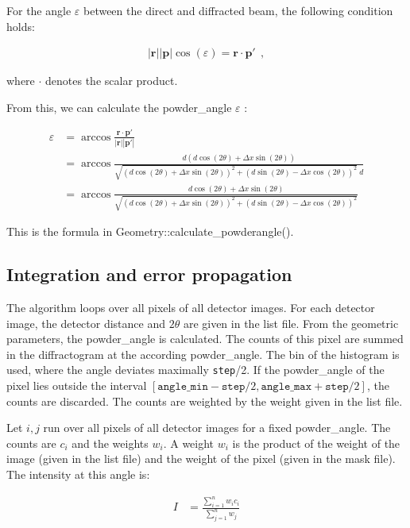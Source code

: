 \documentclass[a4paper, 12pt, twoside]{scrartcl}
\begin{document}
For the angle $ \varepsilon $ between the direct and diffracted beam, the following condition holds:

\begin{align*}
	|\boldsymbol{r}| |\boldsymbol{p}| \cos(\varepsilon) = \boldsymbol{r} \cdot \boldsymbol{p'}~~\mathrm{,}
\end{align*}

where $ \cdot $ denotes the scalar product.

From this, we can calculate the powder\_angle $ \varepsilon $ :

\begin{align*}
	\varepsilon &= \arccos \frac{\boldsymbol{r} \cdot \boldsymbol{p'}}{|\boldsymbol{r}||\boldsymbol{p'}|} \\
	&= \arccos \frac{d ( d\cos(2\theta) + \Delta x \sin(2\theta))}{\sqrt{(d\cos(2\theta) + \Delta x \sin(2\theta))^2 + (d\sin(2\theta) - \Delta x \cos(2\theta))^2}~d} \\
	&= \arccos \frac{d\cos(2\theta) + \Delta x \sin(2\theta)}{\sqrt{(d\cos(2\theta) + \Delta x \sin(2\theta))^2 + (d\sin(2\theta) - \Delta x \cos(2\theta))^2}}
\end{align*}

This is the formula in Geometry::calculate\_powderangle().

\subsection{Integration and error propagation}

The algorithm loops over all pixels of all detector images. For each detector image, the detector distance and $ 2\theta $ are given in the list file. From the geometric parameters, the powder\_angle is calculated. The counts of this pixel are summed in the diffractogram at the according powder\_angle. The bin of the histogram is used, where the angle deviates maximally \verb|step|/2. If the powder\_angle of the pixel lies outside the interval $ [\texttt{angle\_min} - \texttt{step}/2, \texttt{angle\_max} + \texttt{step}/2] $, the counts are discarded. The counts are weighted by the weight given in the list file.

Let $ i, j $ run over all pixels of all detector images for a fixed powder\_angle. The counts are $ c_i $ and the weights $ w_i $. A weight $ w_i $ is the product of the weight of the image (given in the list file) and the weight of the pixel (given in the mask file). The intensity at this angle is:

\begin{align*}
	I &= \frac{\sum\limits_{i = 1}^{n} w_i c_i}{\sum\limits_{j=1}^{n} w_j}
\end{align*}
\end{document}
